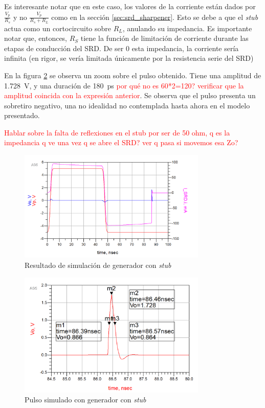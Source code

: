 Es interesante notar que en este caso, los valores de la corriente están dados
por $\frac{V_p}{R_s}$ y no $\frac{V_p}{R_s+R_L}$ como en la sección
\ref{sec:srd_sharpener}. Esto se debe a que el \textit{stub} actua como un
cortocircuito sobre $R_L$, anulando su impedancia. Es importante notar que,
entonces, $R_S$ tiene la función de limitación de corriente durante las etapas
de conducción del SRD. De ser $0$ esta impedancia, la corriente sería infinita
(en rigor, se vería limitada únicamente por la resistencia serie del SRD)

En la figura \ref{fig:stub_generator_result_pulse} se observa un zoom sobre el
pulso obtenido. Tiene una amplitud de \qty{1.728}{\volt}, y una duración
de \qty{180}{\pico\second} \textcolor{red}{por qué no es 60*2=120?}
\textcolor{red}{verificar que la amplitud coincida con la expresión anterior}.
Se observa que el pulso presenta un sobretiro negativo, una no idealidad no
contemplada hasta ahora en el modelo presentado.

\textcolor{red}{Hablar sobre la falta de reflexiones en el stub por ser de 50
ohm, q es la impedancia q ve una vez q se abre el SRD? ver q pasa si movemos esa
Zo?}

\begin{figure}[tbp]
    \centering
    \includegraphics[width=0.8\textwidth]{images/stub_generator_result_waves.png}
    \caption{Resultado de simulación de generador con \textit{stub}}
    \label{fig:generator_result_waves}
\end{figure}

\begin{figure}[tbp]
    \centering
    \includegraphics[width=0.8\textwidth]{images/stub_generator_result_pulse.png}
    \caption{Pulso simulado con generador con \textit{stub}}
    \label{fig:stub_generator_result_pulse}
\end{figure}

